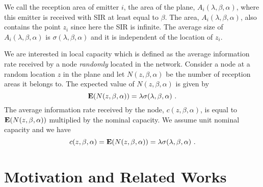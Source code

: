 \documentclass[12pt,english]{article}
\begin{document}
We call the reception area of emitter $i$, the area of the plane, $A_i(\lambda,\beta,\alpha)$, where this emitter is received with SIR at least equal to $\beta$. The area, $A_i(\lambda,\beta,\alpha)$, also contains the point $z_{i}$ since here the SIR is infinite. The average size of $A_i(\lambda,\beta,\alpha)$ is $\sigma(\lambda,\beta,\alpha)$ and it is independent of the location of $z_i$.

We are interested in local capacity which is defined as the average information rate received by a node {\em randomly} located in the network. Consider a node at a random location $z$ in the plane and let $N(z,\beta,\alpha)$ be the number of reception areas it belongs to. The expected value of $N(z,\beta,\alpha)$ is given by~\cite{Jacquet:2009}
\begin{equation}
{\bf E}(N(z,\beta,\alpha))=\lambda\sigma(\lambda,\beta,\alpha)~.
\label{eq:avg_no}
\end{equation}
The average information rate received by the node, $c(z,\beta,\alpha)$, is equal to ${\bf E}(N(z,\beta,\alpha))$ multiplied by the nominal capacity. We assume unit nominal capacity and we have 
\begin{equation}
c(z,\beta,\alpha)={\bf E}(N(z,\beta,\alpha))=\lambda\sigma(\lambda,\beta,\alpha)~. 
\label{eq:poisson_hand_over_no}
\end{equation}

\section{Motivation and Related Works}
\label{sec:context}
\end{document}
